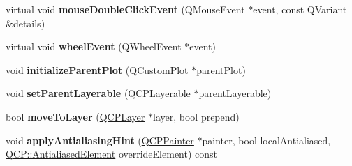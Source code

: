 \begin{DoxyCompactItemize}
virtual void {\bfseries mouse\+Double\+Click\+Event} (Q\+Mouse\+Event $\ast$event, const Q\+Variant \&details)
\item 
\mbox{\label{class_q_c_p_layerable_ae8ec992ac0d81d65c70048fa3e8bd454}} 
virtual void {\bfseries wheel\+Event} (Q\+Wheel\+Event $\ast$event)
\item 
\mbox{\label{class_q_c_p_layerable_a8cbe5a0c9a5674249982f5ca5f8e02bc}} 
void {\bfseries initialize\+Parent\+Plot} (\hyperlink{class_q_custom_plot}{Q\+Custom\+Plot} $\ast$parent\+Plot)
\item 
\mbox{\label{class_q_c_p_layerable_aa23c893671f1f6744ac235cf2204cf3a}} 
void {\bfseries set\+Parent\+Layerable} (\hyperlink{class_q_c_p_layerable}{Q\+C\+P\+Layerable} $\ast$\hyperlink{class_q_c_p_layerable_aa78b7e644d2c519e1a9a6f2ac5fcd858}{parent\+Layerable})
\item 
\mbox{\label{class_q_c_p_layerable_af94484cfb7cbbddb7de522e9be71d9a4}} 
bool {\bfseries move\+To\+Layer} (\hyperlink{class_q_c_p_layer}{Q\+C\+P\+Layer} $\ast$layer, bool prepend)
\item 
\mbox{\label{class_q_c_p_layerable_acb663e375d2d36dc5c55021ee5a2119b}} 
void {\bfseries apply\+Antialiasing\+Hint} (\hyperlink{class_q_c_p_painter}{Q\+C\+P\+Painter} $\ast$painter, bool local\+Antialiased, \hyperlink{namespace_q_c_p_ae55dbe315d41fe80f29ba88100843a0c}{Q\+C\+P\+::\+Antialiased\+Element} override\+Element) const
\end{DoxyCompactItemize}
